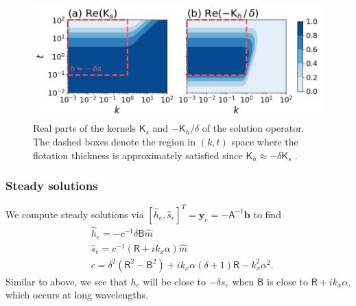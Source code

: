 \documentclass[paper=a4, fontsize=11pt]{article} %
\begin{document}
\begin{figure}
  \centering
\includegraphics[width=0.99\textwidth]{figs/fig5.png}
\caption{Real parts of the kernels $\mathsf{K}_s$ and $-\mathsf{K}_h/\delta$ of the solution operator.
The dashed boxes denote the region in $(k,t)$ space where the flotation thickness is approximately satisfied
since $\mathsf{K}_h\approx -\delta \mathsf{K}_s$ .}
\label{fig:kernels}
\end{figure}

\subsubsection{Steady solutions}
We compute steady solutions via $[\widehat{h}_e,\widehat{s}_e]^T=\pmb{y}_e = -\mathsf{A}^{-1}\pmb{b}$ to find
\begin{align}
&\widehat{h}_e = -c^{-1}\delta\mathsf{B}\widehat{m}\\
&\widehat{s}_e = c^{-1}(\mathsf{R}+ik_x\alpha)\widehat{m}\\
&c = \delta^2(\mathsf{R}^2-\mathsf{B}^2)+ik_x\alpha(\delta+1)\mathsf{R}-k_x^2\alpha^2.
\end{align}
Similar to above, we see that $h_e$ will be close to $-\delta s_e$ when
$\mathsf{B}$ is close to $\mathsf{R} + ik_x\alpha$, which occurs at long wavelengths.
\end{document}
